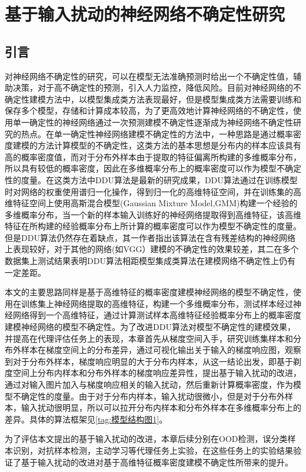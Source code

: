 \chapter{基于输入扰动的神经网络不确定性研究}


\section{引言}
对神经网络不确定性的研究，可以在模型无法准确预测时给出一个不确定性值，辅助决策，对于高不确定性的预测，引入人力监控，降低风险。目前对神经网络的不确定性建模方法中，以模型集成类方法表现最好，但是模型集成类方法需要训练和保存多个模型，存储和计算成本较高，为了更高效地计算神经网络的不确定性，使用单一确定性的神经网络通过一次预测建模不确定性逐渐成为神经网络不确定性研究的热点。在单一确定性神经网络建模不确定性的方法中，一种思路是通过概率密度建模的方法计算模型的不确定性，这类方法的基本思想是分布内的样本应该具有高的概率密度值，而对于分布外样本由于提取的特征偏离所构建的多维概率分布，所以具有较低的概率密度，因此在多维概率分布上的概率密度可以作为模型不确定性的度量。在这类方法中DDU\cite{Mukhoti_2023_CVPR}算法是最新的研究成果，DDU算法通过在训练模型时对网络的权重使用谱归一化操作，得到归一化的高维特征空间，并在训练集的高维特征空间上使用高斯混合模型(Gaussian Mixture Model,GMM)构建一个经验的多维概率分布，当一个新的样本输入训练好的神经网络提取得到高维特征，该高维特征在所构建的经验概率分布上所计算的概率密度可以作为模型不确定性的度量。但是DDU算法仍然存在着缺点，其一作者指出该算法在含有残差结构的神经网络上表现较好，对于其他的网络(如VGG）建模的不确定性的效果较差，其二在多个数据集上测试结果表明DDU算法相距模型集成类算法在建模网络不确定性上仍有一定差距。


本文的主要思路同样是基于高维特征的概率密度建模神经网络的模型不确定性，使用在训练集上神经网络提取的高维特征，构建一个多维概率分布，测试样本经过神经网络得到一个高维特征，通过计算测试样本高维特征经验概率分布上的概率密度建模神经网络的模型不确定性。为了改进DDU算法对模型不确定性的建模效果，并提高在代理评估任务上的表现，本章首先从梯度空间入手，研究训练集样本和分布外样本在梯度空间上的分布差异，通过可视化输出关于输入的梯度响应图，观察到对于分布外样本，梯度响应明显的大于分布内样本，从这一结论出发，即基于剃度空间上分布内样本和分布外样本的梯度响应差异性，提出基于输入扰动的改进，通过对输入图片加入与梯度响应相关的输入扰动，然后重新计算概率密度，作为模型不确定性的度量。由于对于分布内样本，输入扰动很微小，但是对于分布外样本，输入扰动很明显，所以可以拉开分布内样本和分布外样本在多维概率分布上的差异。具体的算法框架见\ref{tag:模型结构图1}。

为了评估本文提出的基于输入扰动的改进，本章后续分别在OOD检测，误分类样本识别，对抗样本检测，主动学习等代理任务上实验，在这些任务上的实验结果验证了基于输入扰动的改进对基于高维特征概率密度建模不确定性所带来的提升。


